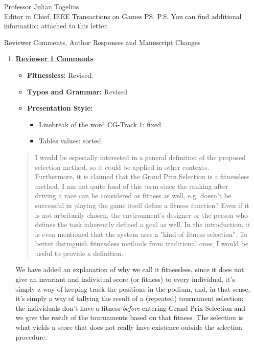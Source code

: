 \documentclass[10pt]{letter} %
\begin{document}
\begin{letter}{Professor Julian Togelius \\ Editor in Chief, IEEE Transactions on Games}
\ps{P.S. You can find additional information attached to this letter.} %







\newpage

Reviewer Comments, Author Responses and Manuscript Changes
\begin{enumerate}
\item {\bf \underline{ Reviewer 1 Comments}}\\
	\begin{itemize}
		\item {\bf Fitnessless:} Revised.
		\item {\bf Typos and Grammar:} Revised
		\item  {\bf Presentation Style:}
		\begin{itemize}
			\item Linebreak of the word CG-Track 1:  fixed
			\item Tables values: sorted
		\end{itemize}
              \end{itemize}
\begin{quote}
I would be especially interested in a general definition of the
proposed selection method, so it could be applied in other
contexts. Furthermore, it is claimed that the Grand Prix Selection is
a fitnessless method. I am not quite fond of this term since the
ranking after driving a race can be considered as fitness as well,
e.g. doesn't be successful in playing the game itself define a fitness
function? Even if it is not arbritarily chosen, the environment's
designer or the person who defines the task inherently defined a goal
as well. In the introduction, it is even mentioned that the system
uses a "kind of fitness selection". To better distinguish fitnessless
methods from traditional ones, I would be useful to provide a
definition.
\end{quote}

We have added an explanation of why we call it fitnessless, since it
does not give an invariant and individual score (or fitness) to every
individual, it's simply a way of keeping track the positions in the
podium, and, in that sense, it's simply a way of tallying the result
of a (repeated) tournament selection; the individuals don't have a
fitness {\em before} entering Grand Prix Selection and we give the
result of the tournaments based on that fitness. The selection is what
yields a score that does not really have existence outside the
selection procedure.


\end{enumerate}
\end{letter}
\end{document}
